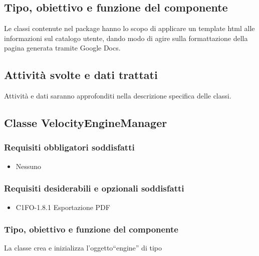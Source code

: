 \subsection*{Tipo, obiettivo e funzione del componente}
Le classi contenute nel package hanno lo scopo di applicare un template html
alle informazioni sul catalogo utente, dando modo di agire sulla formattazione
della pagina generata tramite Google Docs.
\subsection*{Attivit\`a svolte e dati trattati}
 Attivit\`a e dati saranno approfonditi nella descrizione specifica delle
 classi.

\subsection{Classe VelocityEngineManager}
\subsubsection*{Requisiti obbligatori soddisfatti}
\begin{itemize}
  \item Nessuno
\end{itemize}
\subsubsection*{Requisiti desiderabili e opzionali soddisfatti}
\begin{itemize}
  \item C1FO-1.8.1 Esportazione PDF
\end{itemize}
\subsubsection*{Tipo, obiettivo e funzione del componente}
La classe crea e inizializza l'oggetto``engine'' di tipo 
